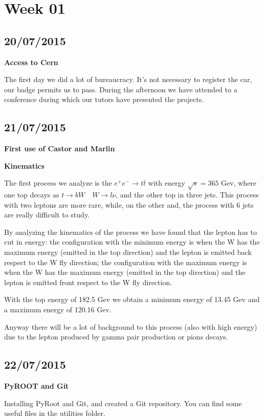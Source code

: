 \section{Week 01}
\subsection{20/07/2015}

\textbf{Access to Cern}

The first day we did a lot of bureaucracy. It's not necessary to register the car, our badge permits us to pass.
During the afternoon we have attended to a conference during which our tutors have presented the projects.


\subsection{21/07/2015}

\textbf{First use of Castor and Marlin}

\textbf{Kinematics}

The first process we analyze is the $e^+ e^- \to t \bar{t} $ with energy $\sqrt{s}=365$ Gev, where one top decays as $t \to bW \quad W \to l\nu$, and the other top in three jets. This process with two leptons are more rare, while, on the other and, the process with 6 jets are really difficult to study.

By analyzing the kinematics of the process we have found that the lepton has to cut in energy:
the configuration with the minimum energy is when the W has the maximum energy (emitted in the top direction) and the lepton is emitted back respect to the W fly direction;
the configuration with the maximum energy is when the W has the maximum energy (emitted in the top direction) and the lepton is emitted front respect to the W fly direction.

With the top energy of 182.5 Gev we obtain a minimum energy of 13.45 Gev and a maximum energy of 120.16 Gev. 

Anyway there will be a lot of background to this process (also with high energy) due to the lepton produced by gamma pair production or pions decays.

\subsection{22/07/2015}

\textbf{PyROOT and Git}

Installing PyRoot and Git, and created a Git repository. You can find some useful files in the utilities folder.

